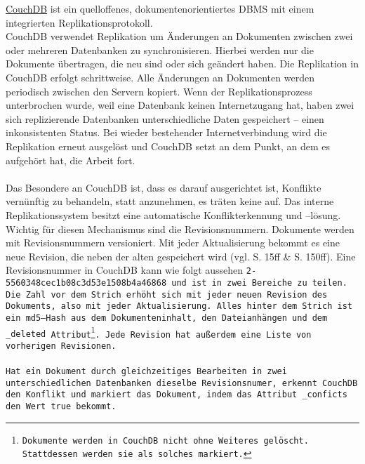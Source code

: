 \hyperref[chap:couch]{CouchDB} ist ein quelloffenes, dokumentenorientiertes \gls{DBMS} mit einem integrierten Replikationsprotokoll.\\
CouchDB verwendet Replikation um Änderungen an Dokumenten zwischen zwei oder mehreren Datenbanken zu synchronisieren.
Hierbei werden nur die Dokumente übertragen, die neu sind oder sich geändert haben.
Die Replikation in CouchDB erfolgt schrittweise. Alle Änderungen an Dokumenten werden periodisch zwischen den Servern kopiert.
Wenn der Replikationsprozess unterbrochen wurde, weil eine Datenbank keinen Internetzugang hat, haben zwei sich replizierende Datenbanken unterschiedliche Daten gespeichert -- einen inkonsistenten Status.
Bei wieder bestehender Internetverbindung wird die Replikation erneut ausgelöst und CouchDB setzt an dem Punkt, an dem es aufgehört hat, die Arbeit fort.\\\\
%
Das Besondere an CouchDB ist, dass es darauf ausgerichtet ist, Konflikte vernünftig zu behandeln, statt anzunehmen, es träten keine auf.
Das interne Replikationssystem besitzt eine automatische Konflikterkennung und --lösung.\\
Wichtig für diesen Mechanismus sind die Revisionsnummern.
Dokumente werden mit Revisionsnummern versioniert. Mit jeder Aktualisierung bekommt es eine neue Revision, die neben der alten gespeichert wird (vgl. \cite{couchDB} S. 15ff \& S. 150ff). 
Eine Revisionsnummer in CouchDB kann wie folgt aussehen \tt{2-5560348cec1b08c3d53e1508b4a46868} und ist in zwei Bereiche zu teilen. Die Zahl vor dem Strich erhöht sich mit jeder neuen Revision des Dokuments, also mit jeder Aktualisierung. Alles hinter dem Strich ist ein md5--\gls{Hash} aus dem Dokumenteninhalt, den Dateianhängen und dem \tt{\_deleted} Attribut\footnote{ Dokumente werden in CouchDB nicht ohne Weiteres gelöscht. Stattdessen werden sie als solches markiert.}.
Jede Revision hat außerdem eine Liste von vorherigen Revisionen.\\\\
Hat ein Dokument durch gleichzeitiges Bearbeiten in zwei unterschiedlichen Datenbanken dieselbe Revisionsnumer, erkennt CouchDB den Konflikt und markiert das Dokument, indem das Attribut \tt{\_conficts} den Wert \tt{true} bekommt.
